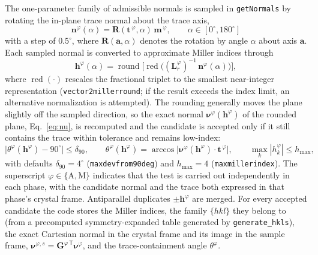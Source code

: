 \documentclass[11pt,a4paper]{article}
\newcommand{\mat}[1]{\mathbf{#1}}
\newcommand{\vc}[1]{\bm{#1}}
\begin{document}
The one-parameter family of admissible normals is sampled in \texttt{getNormals} by rotating the in-plane trace normal about the trace axis,
\begin{equation}
\vc n^{\varphi}(\alpha)=\mat R(\vc t^{\,\varphi},\alpha)\,\vc m^{\,\varphi},
\qquad \alpha \in [0^\circ,180^\circ]
\label{eq:family}
\end{equation}
with a step of $0.5^\circ$, where $\mat R(\vc a,\alpha)$ denotes the rotation by angle $\alpha$ about axis $\vc a$. Each sampled normal is converted to approximate Miller indices through
\begin{equation}
\vc h^{\varphi}(\alpha)=\operatorname{round}\!\Big[\operatorname{red}\big((\mat{L}_{r}^{\varphi})^{-1}\,\vc n^{\varphi}(\alpha)\big)\Big],
\label{eq:miller}
\end{equation}
where $\operatorname{red}(\cdot)$ rescales the fractional triplet to the smallest near-integer representation (\texttt{vector2millerround}; if the result exceeds the index limit, an alternative normalization is attempted). The rounding generally moves the plane slightly off the sampled direction, so the exact normal $\vc \nu^{\varphi}(\vc h^{\varphi})$ of the rounded plane, Eq.~\eqref{eq:nu}, is recomputed and the candidate is accepted only if it still contains the trace within tolerance and remains low-index:
\begin{equation}
\big|\theta^{\varphi}(\vc h^{\varphi})-90^\circ\big|\le \delta_{90},
\qquad
\theta^{\varphi}(\vc h^{\varphi})=\arccos\big|\vc\nu^{\varphi}(\vc h^{\varphi})\cdot\vc t^{\,\varphi}\big|,
\qquad
\max_k |h^{\varphi}_k|\le h_{\max},
\label{eq:accept}
\end{equation}
with defaults $\delta_{90}=4^\circ$ (\texttt{maxdevfrom90deg}) and $h_{\max}=4$ (\texttt{maxmillerindex}). The superscript $\varphi\in\{\mathrm A,\mathrm M\}$ indicates that the test is carried out independently in each phase, with the candidate normal and the trace both expressed in that phase's crystal frame. Antiparallel duplicates $\pm\vc h^{\varphi}$ are merged. For every accepted candidate the code stores the Miller indices, the family $\{hkl\}$ they belong to (from a precomputed symmetry-expanded table generated by \texttt{generate\_hkls}), the exact Cartesian normal in the crystal frame and its image in the sample frame, $\vc \nu^{\varphi,s}=\mat{G}^{\varphi\,\mathsf T}\vc\nu^{\varphi}$, and the trace-containment angle $\theta^{\varphi}$.
\end{document}
